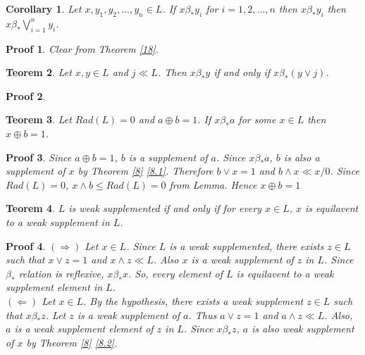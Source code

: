 \documentclass[a4paper,12pt]{article}
\numberwithin{equation}{section}
\theoremstyle{italik}
\newtheorem{teorem}{Teorem}[section]
\newtheorem{sonuc}[teorem]{Corollary}
\newtheorem*{ispat}{Proof}
\begin{document}
\begin{sonuc}\label{19}
    Let $ x, y_1, y_2,...,y_n \in L $. If $ x \beta_* y_i $ for $ i=1,2,...,n $ then  
    $ x \beta_* y_i $ then $ \displaystyle x \beta_* \bigvee_{i=1}^n y_i $.
\end{sonuc}
\begin{ispat}
  Clear from Theorem \ref{18}.
\end{ispat}

\begin{teorem}\label{20}
    Let $ x,y \in L $ and $ j \ll L $. Then $ x \beta_* y $ if and only if $ x \beta_* ( y \vee j ) $.
\end{teorem}

\begin{ispat}
\end{ispat}

\begin{teorem}\label{21}
    Let $ Rad(L)=0 $ and $ a \oplus b = 1 $. If $ x \beta_* a $ for some $ x \in L $ then $ x \oplus b = 1 $. 
\end{teorem}
\begin{ispat}
    Since $ a \oplus b = 1 $, $ b $ is a supplement of $ a $. 
    Since $ x \beta_* a $, $ b $ is also a supplement of $ x $ by Theorem \ref{8} \ref{8.1}. 
    Therefore $ b \vee x = 1 $ and 
    $ b \wedge x \ll x/0 $. Since $ Rad(L)=0 $, $ x \wedge b \leq Rad(L) = 0 $ from 
    Lemma. 
    Hence $ x \oplus b = 1 $
\end{ispat}

\begin{teorem}
    $ L $ is weak supplemented if and only if for every $ x \in L $, $ x $ is equilavent to a weak supplement in $ L $.
\end{teorem}

\begin{ispat}
    $ ( \Rightarrow ) $ 
    Let $ x \in L $. Since $ L $ is a weak supplemented, there exists $ z \in L $ such that 
    $ x \vee z = 1 $ and $ x \wedge z \ll L $. Also $ x $ is a weak supplement of $ z $ in $ L $. 
    Since $ \beta_* $ relation is reflexive, $ x \beta_* x $. So, every element of $ L $ is 
    equilavent to a weak supplement element in $ L $. \\
    $ ( \Leftarrow ) $
    Let $ x \in L $. By the hypothesis, there exists a weak supplement $ z \in L $ such that 
    $ x \beta_* z $. Let $ z $ is a weak supplement of $ a $. Thus $ a \vee z = 1 $ and $ a \wedge z \ll L $. 
    Also, $ a $ is a weak supplement element of $ z $ in $ L $. Since $ x \beta_* z $, 
    $ a $ is also weak supplement of $ x $ by Theorem \ref{8} \ref{8.2}.  
\end{ispat}
\end{document}
